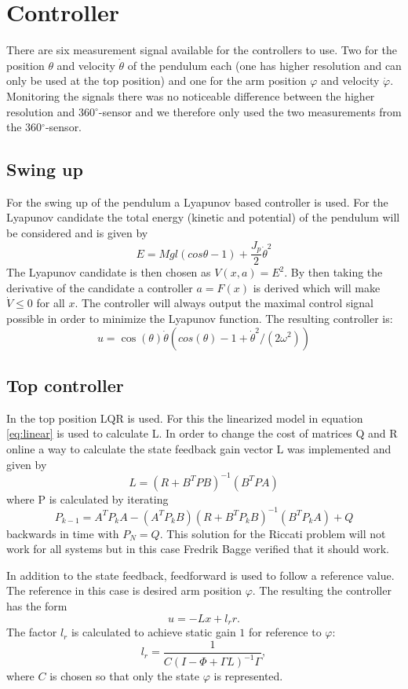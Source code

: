 \documentclass[10pt,a4paper]{article}
\begin{document}
\section{Controller}
There are six measurement signal available for the controllers to use. Two for the position $ \theta $ and velocity $ \dot{\theta} $ of the pendulum each (one has higher resolution and can only  be used at the top position) and one for the arm position $ \varphi $ and velocity $ \dot{\varphi} $. Monitoring the signals there was no noticeable difference between the higher resolution and $ 360{^\circ} $-sensor and we therefore only used the two measurements from the $ 360 {^\circ} $-sensor.
\subsection{Swing up}
For the swing up of the pendulum a Lyapunov based controller is used. For the Lyapunov candidate the total energy (kinetic and potential) of the pendulum will be considered and is given by 
\begin{equation}
E= Mgl(cos\theta - 1)+\frac{J_p}{2}\dot\theta^2
\label{eq:energy}
\end{equation}
The Lyapunov candidate is then chosen as $V(x,a)=E^2$. By then taking the derivative of the candidate a controller $a=F(x)$ is derived which will make $\dot V \leq 0$ for all $x$. The controller will always output the maximal control signal possible in order to minimize the Lyapunov function. The resulting controller is:
\begin{equation}
u = \cos(\theta) \dot\theta (cos(\theta) - 1 + \dot{\theta}^2 / (2 \omega^2))
\end{equation}
\subsection{Top controller}
In the top position LQR is used. For this the linearized model in equation \eqref{eq:linear} is used to calculate L. In order to change the cost of matrices Q and R online a way to calculate the state feedback gain vector L was implemented and given by
$$ L = (R+B^TPB)^{-1}(B^TPA) $$
where P is calculated by iterating
$$ P_{k-1} = A^TP_kA-(A^TP_kB)(R+B^TP_kB)^{-1}(B^TP_kA)+Q $$
backwards in time with $P_N = Q$. This solution for the Riccati problem will not work for all systems but in this case Fredrik Bagge verified that it should work.

In addition to the state feedback, feedforward is used to follow a reference value. The reference in this case is desired arm position $\varphi$. The resulting the controller has the form
\begin{equation}
u = -Lx + l_rr.
\end{equation}
The factor $l_r$ is calculated to achieve static gain $1$ for reference to $\varphi$:
\begin{equation}
l_r = \frac{1}{C(I - \Phi + \Gamma L)^{-1}\Gamma},
\end{equation}
where $C$ is chosen so that only the state $\varphi$ is represented.
\end{document}
